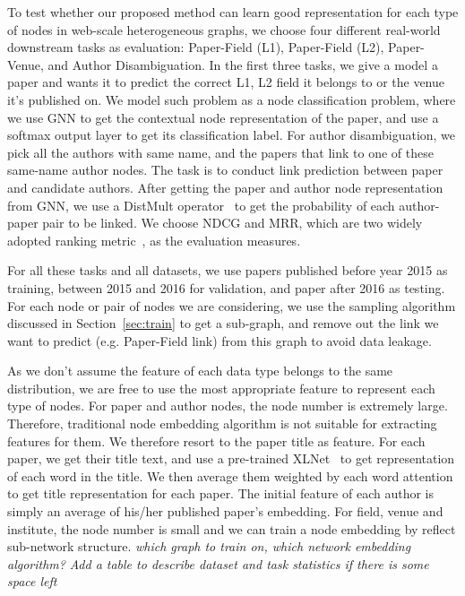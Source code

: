\documentclass[sigconf]{acmart}
\theoremstyle{definition}
\newcommand{\zn}[1]{\textit{{\color{red}#1 }}}
\begin{document}
{To test whether our proposed method can learn good representation for each type of nodes in web-scale heterogeneous graphs, we choose four different real-world downstream tasks as evaluation: Paper-Field (L1), Paper-Field (L2), Paper-Venue, and Author Disambiguation. In the first three tasks, we give a model a paper and wants it to predict the correct L1, L2 field it belongs to or the venue it's published on. We model such problem as a node classification problem, where we use GNN to get the contextual node representation of the paper, and use a softmax output layer to get its classification label. For author disambiguation, we pick all the authors with same name, and the papers that link to one of these same-name author nodes. The task is to conduct link prediction between paper and candidate authors. After getting the paper and author node representation from GNN, we use a DistMult operator~\cite{DBLP:journals/corr/YangYHGD14a} to get the probability of each author-paper pair to be linked. We choose NDCG and MRR, which are two widely adopted ranking metric~\cite{DBLP:books/daglib/0027504, DBLP:series/synthesis/2014Li}, as the evaluation measures.


For all these tasks and all datasets, we use papers published before year 2015 as training, between 2015 and 2016 for validation, and paper after 2016 as testing. For each node or pair of nodes we are considering, we use the sampling algorithm discussed in Section~\ref{sec:train} to get a sub-graph, and remove out the link we want to predict (e.g. Paper-Field link) from this graph to avoid data leakage.

As we don't assume the feature of each data type belongs to the same distribution, we are free to use the most appropriate feature to represent each type of nodes. For paper and author nodes, the node number is extremely large. Therefore, traditional node embedding algorithm is not suitable for extracting features for them. We therefore resort to the paper title as feature. For each paper, we get their title text, and use a pre-trained XLNet~\cite{xlnet, wolf2019transformers} to get representation of each word in the title. We then average them weighted by each word attention to get title representation for each paper. The initial feature of each author is simply an average of his/her published paper's embedding. For field, venue and institute, the node number is small and we can train a node embedding by reflect sub-network structure. \zn{which graph to train on, which network embedding algorithm? }
\zn{Add a table to describe dataset and task statistics if there is some space left}

}
\end{document}
